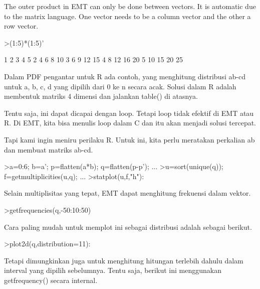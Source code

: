 \documentclass[a4paper,10pt]{article}
\begin{document}
\begin{eulernotebook}
\begin{eulercomment}
\begin{eulercomment}
\begin{eulercomment}
\begin{eulercomment}
\begin{eulercomment}
The outer product in EMT can only be done between vectors. It is
automatic due to the matrix language. One vector needs to be a column
vector and the other a row vector.
\end{eulercomment}
\begin{eulerprompt}
>(1:5)*(1:5)'
\end{eulerprompt}
\begin{euleroutput}
          1         2         3         4         5 
          2         4         6         8        10 
          3         6         9        12        15 
          4         8        12        16        20 
          5        10        15        20        25 
\end{euleroutput}
\begin{eulercomment}
Dalam PDF pengantar untuk R ada contoh, yang menghitung distribusi
ab-cd untuk a, b, c, d yang dipilih dari 0 ke n secara acak. Solusi
dalam R adalah membentuk matriks 4 dimensi dan jalankan table() di
atasnya.

Tentu saja, ini dapat dicapai dengan loop. Tetapi loop tidak efektif
di EMT atau R. Di EMT, kita bisa menulis loop dalam C dan itu akan
menjadi solusi tercepat.

Tapi kami ingin meniru perilaku R. Untuk ini, kita perlu meratakan
perkalian ab dan membuat matriks ab-cd.
\end{eulercomment}
\begin{eulerprompt}
>a=0:6; b=a'; p=flatten(a*b); q=flatten(p-p'); ...
>u=sort(unique(q)); f=getmultiplicities(u,q); ...
>statplot(u,f,"h"):
\end{eulerprompt}
\begin{eulercomment}
Selain multiplisitas yang tepat, EMT dapat menghitung frekuensi dalam
vektor.
\end{eulercomment}
\begin{eulerprompt}
>getfrequencies(q,-50:10:50)
\end{eulerprompt}
\begin{euleroutput}
  [0,  23,  132,  316,  602,  801,  333,  141,  53,  0]
\end{euleroutput}
\begin{eulercomment}
Cara paling mudah untuk memplot ini sebagai distribusi adalah sebagai
berikut.
\end{eulercomment}
\begin{eulerprompt}
>plot2d(q,distribution=11):
\end{eulerprompt}
\begin{eulercomment}
Tetapi dimungkinkan juga untuk menghitung hitungan terlebih dahulu
dalam interval yang dipilih sebelumnya. Tentu saja, berikut ini
menggunakan getfrequency() secara internal.


\end{eulercomment}
\end{eulercomment}
\end{eulercomment}
\end{eulercomment}
\end{eulercomment}
\end{eulernotebook}
\end{document}
